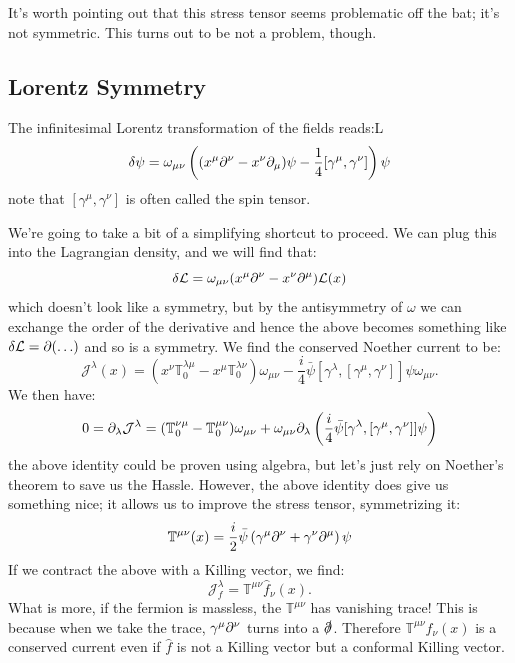 It's worth pointing out that this stress tensor seems problematic off the bat; it's not symmetric. This turns out to be not a problem, though.

\subsection{Lorentz Symmetry}
The infinitesimal Lorentz transformation of the fields reads:L
\begin{equation}
    \delta \psi = \omega_{\mu\nu}\left((x^\mu \partial^\nu - x^\nu \partial_\mu)\psi - \frac{1}{4}[\gamma^\mu, \gamma^\nu]\right)\psi
\end{equation}
note that $[\gamma^\mu, \gamma^\nu]$ is often called the spin tensor.

We're going to take a bit of a simplifying shortcut to proceed. We can plug this into the Lagrangian density, and we will find that:
\begin{equation}
    \delta \mathcal{L} = \omega_{\mu\nu}(x^\mu \partial^\nu - x^\nu \partial^\mu)\mathcal{L}(x)
\end{equation}
which doesn't look like a symmetry, but by the antisymmetry of $\omega$ we can exchange the order of the derivative and hence the above becomes something like $\delta \mathcal{L} = \partial(\ldots)$ and so is a symmetry. We find the conserved Noether current to be:
\begin{equation}
    \mathcal{J}^\lambda (x) = (x^\nu \mathbb{T}_0^{\lambda\mu} - x^\mu \mathbb{T}_0^{\lambda \nu})\omega_{\mu\nu} - \frac{i}{4}\bar{\psi}[\gamma^\lambda, [\gamma^\mu, \gamma^\nu]]\psi \omega_{\mu\nu}.
\end{equation}
We then have:
\begin{equation}
    0 = \partial_\lambda \mathcal{J}^\lambda = (\mathbb{T}_0^{\nu\mu} - \mathbb{T}_0^{\mu\nu})\omega_{\mu\nu} + \omega_{\mu\nu}\partial_\lambda\left(\frac{i}{4}\bar{\psi}[\gamma^\lambda, [\gamma^\mu, \gamma^\nu]]\psi\right)
\end{equation}
the above identity could be proven using algebra, but let's just rely on Noether's theorem to save us the Hassle. However, the above identity does give us something nice; it allows us to improve the stress tensor, symmetrizing it:
\begin{equation}
    \mathbb{T}^{\mu\nu}(x) = \frac{i}{2}\bar{\psi}\left(\gamma^\mu \partial^\nu + \gamma^\nu \partial^\mu\right)\psi
\end{equation}
If we contract the above with a Killing vector, we find:
\begin{equation}
    \mathcal{J}^{\lambda}_f = \mathbb{T}^{\mu\nu}\hat{f}_\nu(x).
\end{equation}
What is more, if the fermion is massless, the $\mathbb{T}^{\mu\nu}$ has vanishing trace! This is because when we take the trace, $\gamma^\mu\partial^\nu$ turns into a $\slashed{\partial}$. Therefore $\mathbb{T}^{\mu\nu}\hat{f}_\nu(x)$ is a conserved current even if $\hat{f}$ is not a Killing vector but a conformal Killing vector.

